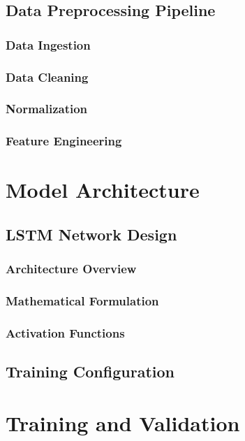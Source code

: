 \documentclass[12pt,a4paper]{article}
\begin{document}
\subsection{Data Preprocessing Pipeline}

\subsubsection{Data Ingestion}

\subsubsection{Data Cleaning}

\subsubsection{Normalization}

\subsubsection{Feature Engineering}

\section{Model Architecture}

\subsection{LSTM Network Design}

\subsubsection{Architecture Overview}

\subsubsection{Mathematical Formulation}

\subsubsection{Activation Functions}

\subsection{Training Configuration}

\section{Training and Validation}
\end{document}
